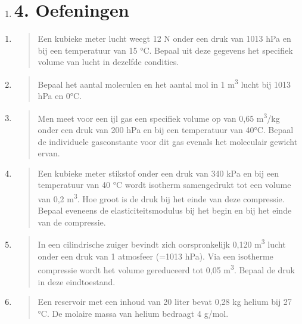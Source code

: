 \documentclass[]{article}
\begin{document}
\begin{enumerate}
\item
  \section{4. Oefeningen}\label{oefeningen}
\end{enumerate}

\begin{enumerate}
\def\labelenumi{\arabic{enumi}.}
\item
  \begin{quote}
  Een kubieke meter lucht weegt 12 N onder een druk van 1013 hPa en bij
  een temperatuur van 15 °C. Bepaal uit deze gegevens het specifiek
  volume van lucht in dezelfde condities.
  \end{quote}
\item
  \begin{quote}
  Bepaal het aantal moleculen en het aantal mol in 1
  m\textsuperscript{3} lucht bij 1013 hPa en 0°C.
  \end{quote}
\item
  \begin{quote}
  Men meet voor een ijl gas een specifiek volume op van 0,65
  m\textsuperscript{3}/kg onder een druk van 200 hPa en bij een
  temperatuur van 40°C. Bepaal de individuele gasconstante voor dit gas
  evenals het moleculair gewicht ervan.
  \end{quote}
\item
  \begin{quote}
  Een kubieke meter stikstof onder een druk van 340 kPa en bij een
  temperatuur van 40 °C wordt isotherm samengedrukt tot een volume van
  0,2 m\textsuperscript{3}. Hoe groot is de druk bij het einde van deze
  compressie. Bepaal eveneens de elasticiteitsmodulus bij het begin en
  bij het einde van de compressie.
  \end{quote}
\item
  \begin{quote}
  In een cilindrische zuiger bevindt zich oorspronkelijk 0,120
  m\textsuperscript{3} lucht onder een druk van 1 atmosfeer (=1013 hPa).
  Via een isotherme compressie wordt het volume gereduceerd tot 0,05
  m\textsuperscript{3}. Bepaal de druk in deze eindtoestand.
  \end{quote}
\item
  \begin{quote}
  Een reservoir met een inhoud van 20 liter bevat 0,28 kg helium bij 27
  °C. De molaire massa van helium bedraagt 4 g/mol.

\end{quote}
\end{enumerate}
\end{document}
